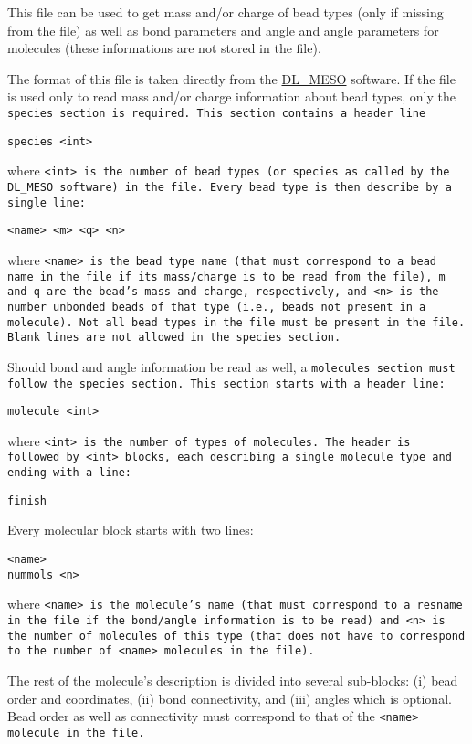 This file can be used to get mass and/or charge of bead types (only if
missing from the \vsf file) as well as bond parameters and angle and angle
parameters for molecules (these informations are not stored in the \vsf
file).

The format of this file is taken directly from the
\href{https://www.scd.stfc.ac.uk/Pages/DL_MESO.aspx}{DL\_MESO}
software. If the \field file is used only to read mass and/or charge
information about bead types, only the \tt{species} section is required.
This section contains a header line
\begin{verbatim}species <int>\end{verbatim}
where \tt{<int>} is the number of bead types (or species as called by the
DL\_MESO software) in the \field file. Every bead type is then describe by
a single line:
\begin{verbatim}<name> <m> <q> <n>\end{verbatim}
where \tt{<name>} is the bead type name (that must correspond to a bead
name in the \vsf file if its mass/charge is to be read from the \field
file), \tt{m} and \tt{q} are the bead's mass and charge, respectively,
and \tt{<n>} is the number unbonded beads of that type (i.e., beads
not present in a molecule). Not all bead types in the \vsf file must be
present in the \field file. Blank lines are not allowed in the \tt{species}
section.

Should bond and angle information be read as well, a \tt{molecules} section
must follow the \tt{species} section. This section starts with a header line:
\begin{verbatim}molecule <int>\end{verbatim}
where \tt{<int>} is the number of types of molecules. The header is
followed by \tt{<int>} blocks, each describing a single molecule type and
ending with a line:
\begin{verbatim}finish\end{verbatim}
Every molecular block starts with two lines:
\begin{verbatim}<name>
nummols <n>\end{verbatim}
where \tt{<name>} is the molecule's name (that must correspond to a
\tt{resname} in the \vsf file if the bond/angle information is to be read)
and \tt{<n>} is the number of molecules of this type (that does not have to
correspond to the number of \tt{<name>} molecules in the \vsf file).

The rest of the molecule's description is divided into several sub-blocks:
(i) bead order and coordinates, (ii) bond connectivity, and (iii) angles
which is optional. Bead order as well as connectivity must correspond to
that of the \tt{<name>} molecule in the \vsf file.

